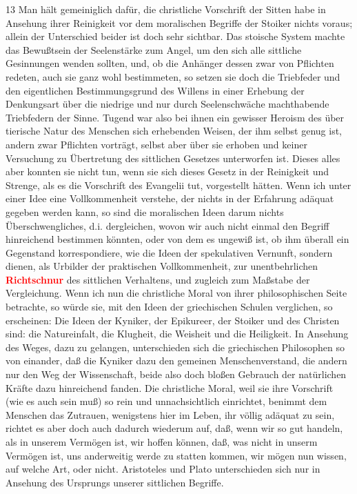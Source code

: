 \documentclass[a4paper,12pt,twoside]{book}
\newcommand{\match}[1]{\textcolor{red}{\textbf{#1}}}
\begin{document}
	13 Man hält gemeiniglich dafür, die christliche Vorschrift der Sitten habe in Ansehung ihrer Reinigkeit vor dem moralischen Begriffe der Stoiker nichts voraus; allein der Unterschied beider ist doch sehr sichtbar. Das stoische System machte das Bewußtsein der Seelenstärke zum Angel, um den sich alle sittliche Gesinnungen wenden sollten, und, ob die Anhänger dessen zwar von Pflichten redeten, auch sie ganz wohl bestimmeten, so setzen sie doch die Triebfeder und den eigentlichen Bestimmungsgrund des Willens in einer Erhebung der Denkungsart über die niedrige und nur durch Seelenschwäche machthabende Triebfedern der Sinne. Tugend war also bei ihnen ein gewisser Heroism des über tierische Natur des Menschen sich erhebenden Weisen, der ihm selbst genug ist, andern zwar Pflichten vorträgt, selbst aber über sie erhoben und keiner Versuchung zu Übertretung des sittlichen Gesetzes unterworfen ist. Dieses alles aber konnten sie nicht tun, wenn sie sich dieses Gesetz in der Reinigkeit und Strenge, als es die Vorschrift des Evangelii tut, vorgestellt hätten. Wenn ich unter einer Idee eine Vollkommenheit verstehe, der nichts in der Erfahrung adäquat gegeben werden kann, so sind die moralischen Ideen darum nichts Überschwengliches, d.i. dergleichen, wovon wir auch nicht einmal den Begriff hinreichend bestimmen könnten, oder von dem es ungewiß ist, ob ihm überall ein Gegenstand korrespondiere, wie die Ideen der spekulativen Vernunft, sondern dienen, als Urbilder der praktischen Vollkommenheit, zur unentbehrlichen \match{Richtschnur} des sittlichen Verhaltens, und zugleich zum Maßstabe der Vergleichung. Wenn ich nun die christliche Moral von ihrer philosophischen Seite betrachte, so würde sie, mit den Ideen der griechischen Schulen verglichen, so erscheinen: Die Ideen der Kyniker, der Epikureer, der Stoiker und des Christen sind: die Natureinfalt, die Klugheit, die Weisheit und die Heiligkeit. In Ansehung des Weges, dazu zu gelangen, unterschieden sich die griechischen Philosophen so von einander, daß die Kyniker dazu den gemeinen Menschenverstand, die andern nur den Weg der Wissenschaft, beide also doch bloßen Gebrauch der natürlichen Kräfte dazu hinreichend fanden. Die christliche Moral, weil sie ihre Vorschrift (wie es auch sein muß) so rein und unnachsichtlich einrichtet, benimmt dem Menschen das Zutrauen, wenigstens hier im Leben, ihr völlig adäquat zu sein, richtet es aber doch auch dadurch wiederum auf, daß, wenn wir so gut handeln, als in unserem Vermögen ist, wir hoffen können, daß, was nicht in unserm Vermögen ist, uns anderweitig werde zu statten kommen, wir mögen nun wissen, auf welche Art, oder nicht. Aristoteles und Plato unterschieden sich nur in Ansehung des Ursprungs unserer sittlichen Begriffe. 
	
\end{document}
